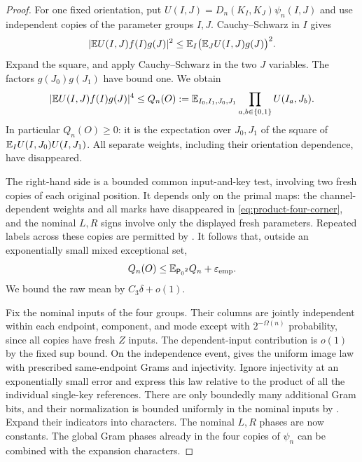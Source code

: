 \begin{proof}
For one fixed orientation, put
$U(I,J)=D_n(K_I,K_J)\psi_n(I,J)$ and use independent copies of the
parameter groups $I,J$. Cauchy--Schwarz in $I$ gives
\[
 \lvert \mathbb E U(I,J)f(I)g(J)\rvert^2
 \le\mathbb E_I\bigl(\mathbb E_JU(I,J)g(J)\bigr)^2.
\]
Expand the square, and apply Cauchy--Schwarz in the two $J$ variables.
The factors $g(J_0)g(J_1)$ have bound one. We obtain
\begin{equation}\label{eq:product-four-corner}
 \lvert \mathbb E U(I,J)f(I)g(J)\rvert^4
 \le Q_n(O):=
 \mathbb E_{I_0,I_1,J_0,J_1}
       \prod_{a,b\in\{0,1\}}U(I_a,J_b).
\end{equation}
In particular $Q_n(O)\ge0$: it is the expectation over $J_0,J_1$ of
the square of $\mathbb E_IU(I,J_0)U(I,J_1)$. All separate weights, including
their orientation dependence, have disappeared.

The right-hand side is a bounded common input-and-key test, involving
two fresh copies of each original position. It depends only on the
primal maps: the channel-dependent weights and all marks have
disappeared in \eqref{eq:product-four-corner}, and the nominal $L,R$
signs involve only the displayed fresh parameters. Repeated labels across
these copies are permitted by . It follows that,
outside an exponentially small mixed exceptional set,
\begin{equation}\label{eq:product-four-corner-typical}
 Q_n(O)\le\mathbb E_{{\mathsf P_0}^2}Q_n+\varepsilon_{\mathrm{emp}}.
\end{equation}
We bound the raw mean by $C_3\delta+o(1)$.

Fix the nominal inputs of the four groups. Their columns are jointly
independent within each endpoint, component, and mode except with
$2^{-\Omega(n)}$ probability, since all copies have fresh $Z$ inputs.
The dependent-input contribution is $o(1)$ by the fixed sup bound.
On the independence event,  gives the uniform
image law with prescribed same-endpoint Grams and injectivity.
Ignore injectivity at an exponentially small error and express this
law relative to the product of all the individual single-key
references. There are only boundedly many additional Gram bits, and
their normalization is bounded uniformly in the nominal inputs by
. Expand their indicators into
characters. The nominal $L,R$ phases are now constants. The global
Gram phases already in the four copies of $\psi_n$ can be combined
with the expansion characters.


\end{proof}
